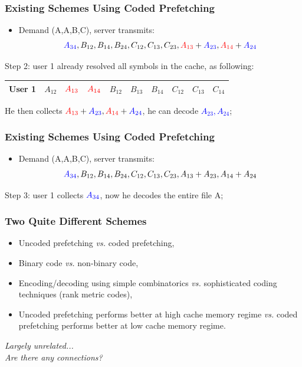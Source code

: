 \documentclass{beamer}
\begin{document}
\begin{frame}
\frametitle{Existing Schemes Using Coded Prefetching}
\begin{itemize}
\item Demand (A,A,B,C), server transmits:
\begin{align*}
\textcolor{blue}{A_{34}}, B_{12}, B_{14}, B_{24}, C_{12},C_{13}, C_{23}, \textcolor{red}{A_{13}}+\textcolor{blue}{A_{23}},\textcolor{red}{A_{14}}+\textcolor{blue}{A_{24}}
\end{align*}
\end{itemize}
Step 2: user 1 already resolved all symbols in the cache, as following:
\begin{table}[]
\centering
\begin{tabular}{|l||l|l|l|l|l|l|l|l|l|}
\hline
User 1 & $A_{12}$ & $\textcolor{red}{A_{13}}$ & $\textcolor{red}{A_{14}}$ & $B_{12}$ & $B_{13}$ & $B_{14}$ & $C_{12}$ & $C_{13}$ & $C_{14}$ \\ \hline
\end{tabular}
\end{table}
He then collects $\textcolor{red}{A_{13}}+\textcolor{blue}{A_{23}},\textcolor{red}{A_{14}}+\textcolor{blue}{A_{24}}$, he can decode \textcolor{blue}{$A_{23}, A_{24}$};
\end{frame}

\begin{frame}
\frametitle{Existing Schemes Using Coded Prefetching}
\begin{itemize}
\item Demand (A,A,B,C), server transmits:
\begin{align*}
\textcolor{blue}{A_{34}}, B_{12}, B_{14}, B_{24}, C_{12},C_{13}, C_{23}, A_{13}+A_{23},A_{14}+A_{24}
\end{align*}
\end{itemize}
Step 3: user 1 collects $\textcolor{blue}{A_{34}}$, now he decodes the entire file A;
\end{frame}


\begin{frame}
\frametitle{Two Quite Different Schemes}
\begin{itemize}
\item Uncoded prefetching \textit{vs.} coded prefetching,
\item Binary code \textit{vs.} non-binary code,
\item Encoding/decoding using simple combinatorics \textit{vs.} sophisticated coding techniques (rank metric codes),
\item Uncoded prefetching performs better at high cache memory regime \textit{vs.} coded prefetching performs better at low cache memory regime.
\end{itemize}
\centering
\textit{Largely unrelated... }\\
\textit{Are there any connections?}
\end{frame}
\end{document}
